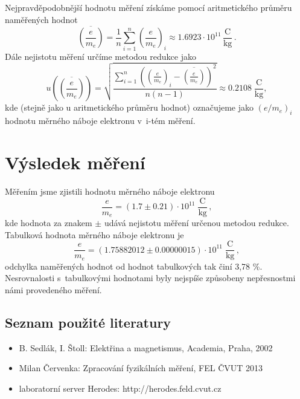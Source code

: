 \documentclass{report}
\begin{document}
		Nejpravděpodobnější hodnotu měření získáme pomocí aritmetického průměru naměřených hodnot
		\begin{equation*}
			\overline{\left( \frac{e}{m_e} \right)} = \frac{1}{n} \sum_{i=1}^{n} \left( \frac{e}{m_e} \right)_i \approx 1.6923 \cdot 10^{11} \, \frac{\text{C}}{\text{kg}} \, .
		\end{equation*}
		Dále nejistotu měření určíme metodou redukce jako
		\begin{equation*}
			u \left( \overline{\left( \frac{e}{m_e} \right)} \right)
			= \sqrt{\frac{\sum_{i=1}^{n} \left( \left( \frac{e}{m_e} \right)_i - \overline{\left( \frac{e}{m_e} \right)} \right)^2}{n(n-1)}}
			\approx 0.2108  \; \frac{\text{C}}{\text{kg}} ,
		\end{equation*}
		kde (stejně jako u aritmetického průměru hodnot) označujeme jako $(e/m_e)_i$  hodnotu měrného náboje elektronu v i-tém měření.
		
	\section*{Výsledek měření}
		Měřením jsme zjistili hodnotu měrného náboje elektronu
		\begin{equation*}
			\frac{e}{m_e} = (1.7 \pm 0.21) \cdot 10^{11} \; \frac{\text{C}}{\text{kg}} \, ,
		\end{equation*}
		kde hodnota za znakem $\pm$ udává nejistotu měření určenou metodou redukce. \\
		Tabulková hodnota měrného náboje elektronu je
		\begin{equation*}
			\frac{e}{m_e} = (1.75882012 \pm 0.00000015) \cdot 10^{11} \; \frac{\text{C}}{\text{kg}} \, ,
		\end{equation*}
		odchylka naměřených hodnot od hodnot tabulkových tak činí 3,78 \%. Nesrovnalosti s tabulkovými hodnotami byly nejspíše způsobeny nepřesnostmi námi provedeného měření.
		
		\subsection*{Seznam použité literatury}
			\begin{itemize}
				\item B. Sedlák, I. Štoll: Elektřina a magnetismus, Academia, Praha, 2002
				\item Milan Červenka: Zpracování fyzikálních měření, FEL ČVUT 2013
				\item laboratorní server Herodes: http://herodes.feld.cvut.cz
			\end{itemize}
\end{document}
